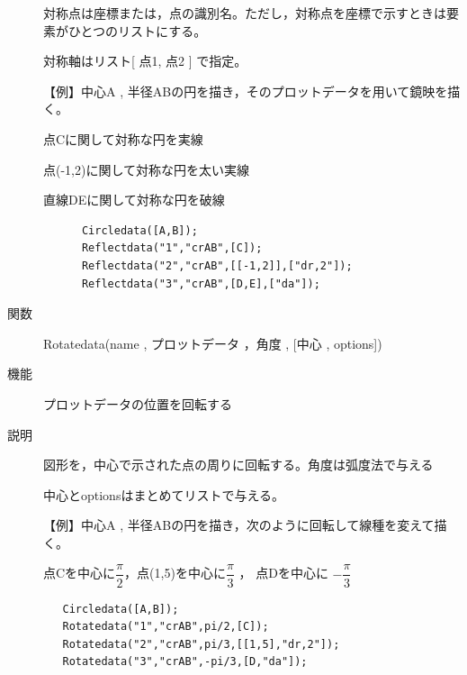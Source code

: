 \documentclass[papersize,a4paper,12pt,uplatex]{jsarticle}
\begin{document}
\begin{description}
  対称点は座標または，点の識別名。ただし，対称点を座標で示すときは要素がひとつのリストにする。
  
  対称軸はリスト[ 点1, 点2 ]  で指定。

\vspace{\baselineskip}
【例】中心A , 半径ABの円を描き，そのプロットデータを用いて鏡映を描く。

点Cに関して対称な円を実線

点(-1,2)に関して対称な円を太い実線

直線DEに関して対称な円を破線

\begin{verbatim}
      Circledata([A,B]);
      Reflectdata("1","crAB",[C]);
      Reflectdata("2","crAB",[[-1,2]],["dr,2"]);
      Reflectdata("3","crAB",[D,E],["da"]);
\end{verbatim}
\vspace{\baselineskip}
 \begin{center}  \end{center}


\vspace{\baselineskip}
\hypertarget{rotatedata}{}
\item[関数]  Rotatedata(name , プロットデータ ，角度 , [中心 , options])
\item[機能]  プロットデータの位置を回転する
\item[説明]  図形を，中心で示された点の周りに回転する。角度は弧度法で与える

  中心とoptionsはまとめてリストで与える。

\begin{spacing}{1.5}
【例】中心A , 半径ABの円を描き，次のように回転して線種を変えて描く。

 点Cを中心に$\dfrac{\pi}{2} $，点(1,5)を中心に$\dfrac{\pi}{3}$ ， 点Dを中心に $-\dfrac{\pi}{3} $
\end{spacing}
\begin{verbatim}
   Circledata([A,B]);
   Rotatedata("1","crAB",pi/2,[C]);
   Rotatedata("2","crAB",pi/3,[[1,5],"dr,2"]);
   Rotatedata("3","crAB",-pi/3,[D,"da"]);
\end{verbatim}
\vspace{\baselineskip}
\begin{center}\scalebox{0.9}{  }\end{center}
 

\end{description}
\end{document}
